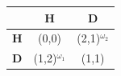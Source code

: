 \documentclass{standalone}
\begin{document}
\begin{tabular}{|l|c|c|}
\hline
 & \textbf{H} & \textbf{D} \\ \hline
\textbf{H} & (0,0) & \cellcolor{lightgray}(2,1)$^{\omega_2}$ \\ \hline
\textbf{D} & \cellcolor{lightgray}(1,2)$^{\omega_1}$ & (1,1) \\ \hline
\end{tabular}
\end{document}
